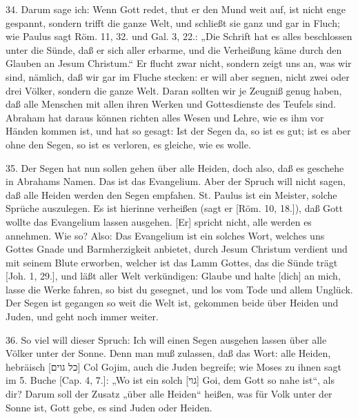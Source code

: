 34. Darum sage ich: Wenn Gott redet, thut er den Mund weit auf, ist nicht enge gespannt, sondern trifft die ganze Welt, und schließt sie ganz und gar in Fluch; wie Paulus sagt Röm. 11, 32. und Gal. 3, 22.: „Die Schrift hat es alles beschlossen unter die Sünde, daß er sich aller erbarme, und die Verheißung käme durch den Glauben an Jesum Christum.“ Er flucht zwar nicht, sondern zeigt uns an, was wir sind, nämlich, daß wir gar im Fluche stecken: er will aber segnen, nicht zwei oder drei Völker, sondern die ganze Welt. Daran sollten wir je Zeugniß genug haben, daß alle Menschen mit allen ihren Werken und Gottesdienste des Teufels sind. Abraham hat daraus können richten alles Wesen und Lehre, wie es ihm vor Händen kommen ist, und hat so gesagt: Ist der Segen da, so ist es gut; ist es aber ohne den Segen, so ist es verloren, es gleiche, wie es wolle.

35. Der Segen hat nun sollen gehen über alle Heiden, doch also, daß es geschehe in Abrahams Namen. Das ist das Evangelium. Aber der Spruch will nicht sagen, daß alle Heiden werden den Segen empfahen. St. Paulus ist ein Meister, solche Sprüche auszulegen. Es ist hierinne verheißen (sagt er [Röm. 10, 18.]), daß Gott wollte das Evangelium lassen ausgehen. [Er] spricht nicht, alle werden es annehmen. Wie so? Also: Das Evangelium ist ein solches Wort, welches uns Gottes Gnade und Barmherzigkeit anbietet, durch Jesum Christum verdient und mit seinem Blute erworben, welcher ist das Lamm Gottes, das die Sünde trägt [Joh. 1, 29.], und läßt aller Welt verkündigen: Glaube und halte [dich] an mich, lasse die Werke fahren, so bist du gesegnet, und los vom Tode und allem Unglück. Der Segen ist gegangen so weit die Welt ist, gekommen beide über Heiden und Juden, und geht noch immer weiter.

36. So viel will dieser Spruch: Ich will einen Segen ausgehen lassen über alle Völker unter der Sonne. Denn man muß zulassen, daß das Wort: alle Heiden, hebräisch [כל גוים] Col Gojim, auch die Juden begreife; wie Moses zu ihnen sagt im 5. Buche [Cap. 4, 7.]: „Wo ist ein solch [גוי] Goi, dem Gott so nahe ist“, als dir? Darum soll der Zusatz „über alle Heiden“ heißen, was für Volk unter der Sonne ist, Gott gebe, es sind Juden oder Heiden.

